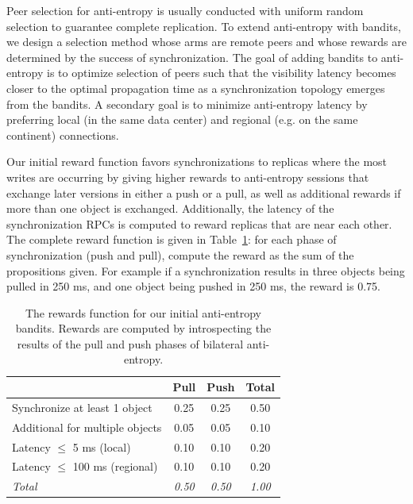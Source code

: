 Peer selection for anti-entropy is usually conducted with uniform random
selection to guarantee complete replication.
To extend anti-entropy with bandits, we design a selection method whose arms
are remote peers and whose rewards are determined by the success of
synchronization.
The goal of adding bandits to anti-entropy is to optimize selection of peers
such that the visibility latency becomes closer to the optimal propagation
time as a synchronization topology emerges from the bandits.
A secondary goal is to minimize anti-entropy latency by preferring local (in
the same data center) and regional (e.g. on the same continent) connections.

Our initial reward function favors synchronizations to replicas where the
most writes are occurring by giving higher rewards to anti-entropy sessions
that exchange later versions in either a push or a pull, as well as additional
rewards if more than one object is exchanged.
Additionally, the latency of the synchronization RPCs is computed to reward
replicas that are near each other.
The complete reward function is given in Table~\ref{tab:ch06_rewards}: for each
phase of synchronization (push and pull), compute the reward as the sum of the
propositions given.
For example if a synchronization results in three objects being pulled in
250 ms, and one object being pushed in 250 ms, the reward is 0.75.

\renewcommand{\baselinestretch}{1}
\small\normalsize
 \begin{table}[ht]
\caption[Bandit Reward Function]{The rewards function for our initial anti-entropy bandits. Rewards are computed by introspecting the results of the pull and push phases of bilateral anti-entropy.}
\begin{center}
\begin{tabular}{@{}l c c c @{}}
\hline
& \textbf{Pull} & \textbf{Push} & \textbf{Total} \\
\hline \hline
Synchronize at least 1 object & 0.25 & 0.25 & 0.50 \\
Additional for multiple objects  & 0.05 & 0.05 & 0.10 \\
Latency $\leq$ 5 ms (local)        & 0.10 & 0.10 & 0.20 \\
Latency $\leq$ 100 ms (regional)   & 0.10 & 0.10 & 0.20 \\
\hline
\textit{Total} & \textit{0.50} & \textit{0.50} & \textit{1.00} \\
\hline
\end{tabular}
\end{center}
\label{tab:ch06_rewards}
\end{table}
 \renewcommand{\baselinestretch}{2}
\small\normalsize

